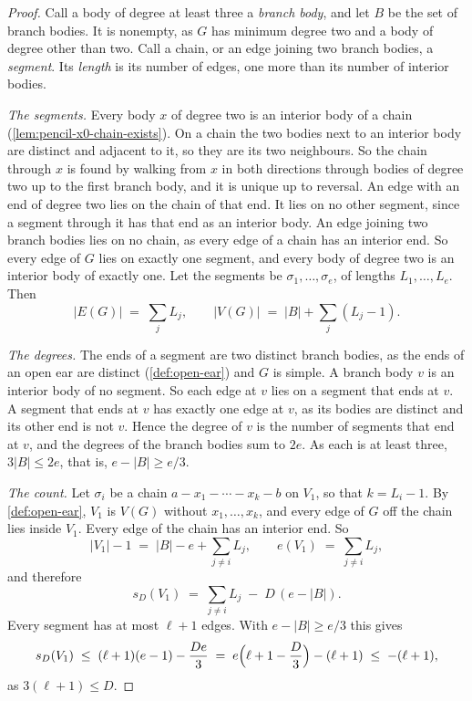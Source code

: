 \begin{proof}
  \leanok
  Call a body of degree at least three a \emph{branch body}, and let $B$
  be the set of branch bodies. It is nonempty, as $G$ has minimum degree
  two and a body of degree other than two. Call a chain, or an edge
  joining two branch bodies, a \emph{segment}. Its \emph{length} is its
  number of edges, one more than its number of interior bodies.

  \emph{The segments.} Every body $x$ of degree two is an interior body
  of a chain (\cref{lem:pencil-x0-chain-exists}). On a chain the two
  bodies next to an interior body are distinct and adjacent to it, so
  they are its two neighbours. So the chain through $x$ is found by
  walking from $x$ in both directions through bodies of degree two up to
  the first branch body, and it is unique up to reversal. An edge with an
  end of degree two lies on the chain of that end. It lies on no other
  segment, since a segment through it has that end as an interior body.
  An edge joining two branch bodies lies on no chain, as every
  edge of a chain has an interior end. So every edge of $G$ lies on
  exactly one segment, and every body of degree two is an interior body
  of exactly one. Let the segments be $\sigma_1, \dots, \sigma_e$, of
  lengths $L_1, \dots, L_e$. Then
  \[
    |E(G)| \;=\; \sum_j L_j, \qquad
    |V(G)| \;=\; |B| + \sum_j (L_j - 1).
  \]

  \emph{The degrees.} The ends of a segment are two distinct branch
  bodies, as the ends of an open ear are distinct (\cref{def:open-ear})
  and $G$ is simple. A branch body $v$ is an interior body of no
  segment. So each edge at $v$ lies on a segment that ends at $v$. A
  segment that ends at $v$ has exactly one edge at $v$, as its bodies
  are distinct and its other end is not $v$. Hence the
  degree of $v$ is the number of segments that end at $v$, and the
  degrees of the branch bodies sum to $2e$. As each is at least three,
  $3|B| \le 2e$, that is, $e - |B| \ge e/3$.

  \emph{The count.} Let $\sigma_i$ be a chain
  $a - x_1 - \cdots - x_k - b$ on $V_1$, so that $k = L_i - 1$. By
  \cref{def:open-ear}, $V_1$ is $V(G)$ without $x_1, \dots, x_k$, and
  every edge of $G$ off the chain lies inside $V_1$. Every edge of the
  chain has an interior end. So
  \[
    |V_1| - 1 \;=\; |B| - e + \sum_{j \neq i} L_j, \qquad
    e(V_1) \;=\; \sum_{j \neq i} L_j,
  \]
  and therefore
  \[
    s_D(V_1) \;=\; \sum_{j \neq i} L_j \;-\; D\,(e - |B|).
  \]
  Every segment has at most $\ell + 1$ edges. With $e - |B| \ge e/3$
  this gives
  \[
    s_D(V_1) \;\le\; (\ell + 1)(e - 1) - \frac{D e}{3}
    \;=\; e\Bigl(\ell + 1 - \frac{D}{3}\Bigr) - (\ell + 1)
    \;\le\; -(\ell + 1),
  \]
  as $3(\ell + 1) \le D$.


\end{proof}
